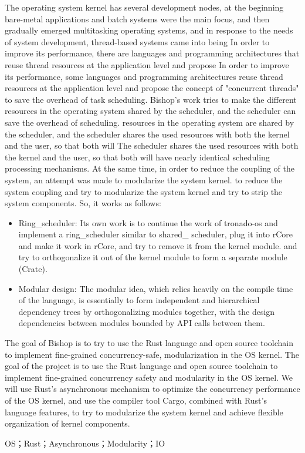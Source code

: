 The operating system kernel has several development nodes, at the beginning bare-metal applications and batch systems were the main focus, and then gradually emerged multitasking operating systems, and in response to the needs of system development, thread-based systems came into being In order to improve its performance, there are languages and programming architectures that reuse thread resources at the application level and propose In order to improve its performance, some languages and programming architectures reuse thread resources at the application level and propose the concept of "concurrent threads" to save the overhead of task scheduling. Bishop's work tries to make the different resources in the operating system shared by the scheduler, and the scheduler can save the overhead of scheduling. resources in the operating system are shared by the scheduler, and the scheduler shares the used resources with both the kernel and the user, so that both will The scheduler shares the used resources with both the kernel and the user, so that both will have nearly identical scheduling processing mechanisms. At the same time, in order to reduce the coupling of the system, an attempt was made to modularize the system kernel. to reduce the system coupling and try to modularize the system kernel and try to strip the system components. So, it works as follows:


\begin{itemize}
\item Ring\_scheduler: Its own work is to continue the work of tronado-os and implement a ring\_scheduler similar to shared\_
scheduler, plug it into rCore and make it work in rCore, and try to remove it from the kernel module.
and try to orthogonalize it out of the kernel module to form a separate module (Crate).

\item Modular design: The modular idea, which relies heavily on the compile time of the language, is essentially to form independent and hierarchical dependency trees by orthogonalizing modules together, with the design dependencies between modules bounded by API calls between them.
\end{itemize}


The goal of Bishop is to try to use the Rust language and open source toolchain to implement fine-grained concurrency-safe, modularization in the OS kernel.
The goal of the project is to use the Rust language and open source toolchain to implement fine-grained concurrency safety and modularity in the OS kernel. We will use Rust's asynchronous mechanism to optimize the concurrency performance of the OS kernel, and use the compiler tool Cargo, combined with Rust's language features, to try to modularize the system kernel and achieve flexible organization of kernel components.

\keywordsen\quad OS；Rust；Asynchronous；Modularity；IO
